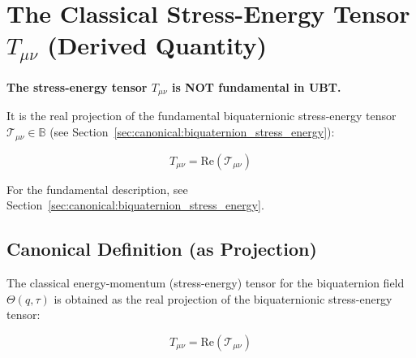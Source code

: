 

\section{The Classical Stress-Energy Tensor $T_{\mu\nu}$ (Derived Quantity)}
\label{sec:canonical:stress_energy}

\begin{tcolorbox}[colback=yellow!10!white,colframe=orange!75!black,title=Important: This is a Derived Quantity]
\textbf{The stress-energy tensor $T_{\mu\nu}$ is NOT fundamental in UBT.}

It is the real projection of the fundamental biquaternionic stress-energy tensor $\mathcal{T}_{\mu\nu} \in \mathbb{B}$ (see Section~\ref{sec:canonical:biquaternion_stress_energy}):

\begin{equation}
T_{\mu\nu} = \text{Re}(\mathcal{T}_{\mu\nu})
\end{equation}

For the fundamental description, see Section~\ref{sec:canonical:biquaternion_stress_energy}.
\end{tcolorbox}

\subsection{Canonical Definition (as Projection)}

The classical energy-momentum (stress-energy) tensor for the biquaternion field $\Theta(q,\tau)$ is obtained as the real projection of the biquaternionic stress-energy tensor:

\begin{equation}
\label{eq:canonical:stress_energy_projection}
\boxed{T_{\mu\nu} = \text{Re}(\mathcal{T}_{\mu\nu})}
\end{equation}

